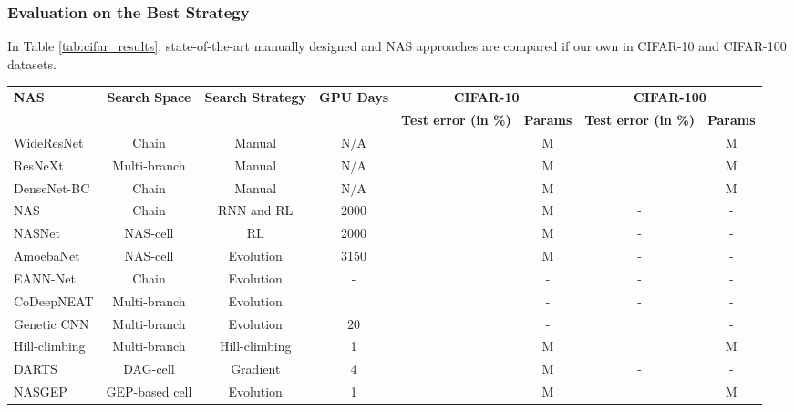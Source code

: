\documentclass[conference]{IEEEtran}
\begin{document}
	\subsubsection{Evaluation on the Best Strategy}
	
	In Table \ref{tab:cifar_results}, state-of-the-art manually designed and NAS approaches are compared if our own in CIFAR-10 and CIFAR-100 datasets.
	
	\begin{table*}[htb]
		\centering
		\caption{Results from CIFAR datasets.}
		\label{tab:cifar_results}{\begin{tabular}{@{}lccccccc@{}}
				\toprule
				\multirow{2}{*}{\textbf{NAS}} & \multirow{2}{*}{\textbf{Search Space}} & \multirow{2}{*}{\textbf{Search Strategy}} & \multirow{2}{*}{\textbf{GPU Days}} & \multicolumn{2}{c}{\textbf{CIFAR-10}} & \multicolumn{2}{c}{\textbf{CIFAR-100}} \\
				&  &  &  & \textbf{Test error (in \%)} & \textbf{Params} & \textbf{Test error (in \%)} & \textbf{Params} \\ \midrule
				WideResNet \cite{zagoruyko2016wide} & Chain & Manual & N/A &  & M &  & M \\
				ResNeXt \cite{xie2017aggregated} & Multi-branch & Manual & N/A &  & M &  & M \\
				DenseNet-BC \cite{huang2017densely} & Chain & Manual & N/A &  & M &  & M \\ \midrule                
				NAS \cite{zoph2016neural} & Chain & RNN and RL & 2000 &  & M & - & - \\
				NASNet \cite{zoph2017learning} & NAS-cell & RL & 2000 &  & M & - & - \\
				AmoebaNet \cite{real2018regularized} & NAS-cell & Evolution & 3150 &  & M & - & - \\
				EANN-Net \cite{chen2019auto} & Chain & Evolution &  - &  & - & - & - \\
				CoDeepNEAT \cite{miikkulainen2017evolving} & Multi-branch & Evolution &  &  & - & - & - \\
				Genetic CNN \cite{xie2017genetic} & Multi-branch & Evolution & 20 &  & - &  & - \\
				Hill-climbing \cite{elsken2017simple} & Multi-branch & Hill-climbing & 1 &  & M &  & M \\                               
				DARTS \cite{liu2018darts} & DAG-cell & Gradient & 4 &  & M & - & - \\ \midrule
				NASGEP & GEP-based cell & Evolution & 1 &  & M &  & M \\ \bottomrule
			\end{tabular}}
	\end{table*}
	
\end{document}
